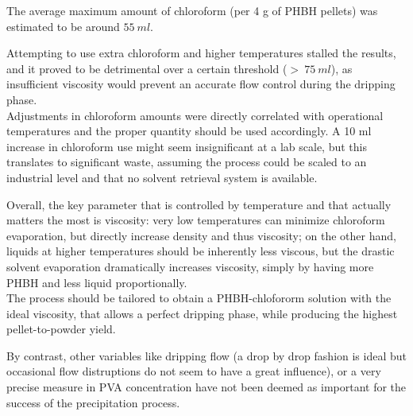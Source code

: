 \documentclass{article}
\begin{document}
        The average maximum amount of chloroform (per 4 g of PHBH pellets) was estimated to be around $55 \ ml$. 

        Attempting to use extra chloroform and higher temperatures stalled the 
        results, and it proved to be detrimental over a certain threshold ($ > \ 75 \ ml$), as insufficient 
        viscosity would prevent an accurate flow control during the dripping phase. \\ 

        Adjustments in chloroform amounts were directly correlated with operational temperatures and the proper quantity should 
        be used accordingly. 
        A 10 ml increase in chloroform use might seem insignificant at a lab scale, but this translates to significant waste, 
        assuming the process could be scaled to an industrial level and that no solvent retrieval system is available. 


        Overall, the key parameter that is controlled by temperature and that actually matters the most is viscosity: 
        very low temperatures can minimize chloroform evaporation, 
        but directly increase density and thus viscosity; on the other hand, liquids at higher temperatures should be inherently 
        less viscous, but the drastic solvent evaporation dramatically increases viscosity, simply by having more PHBH and less 
        liquid proportionally. \\ 
        
        The process should be tailored to obtain a PHBH-chlofororm solution with the ideal viscosity, that allows a perfect dripping 
        phase, while producing the highest pellet-to-powder yield. 


        By contrast, other variables like dripping flow (a drop by drop fashion is ideal but occasional 
        flow distruptions do not seem to have a great influence), or a very precise measure in 
        PVA concentration have not been deemed as important for the success of the precipitation process. 
\end{document}
